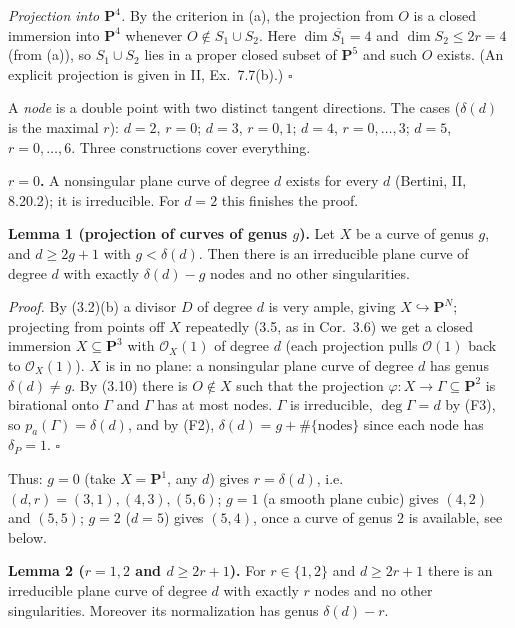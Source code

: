 \documentclass[11pt]{article}
\begin{document}
\emph{Projection into $\mathbf P^4$.} By the criterion in (a), the projection from $O$ is a closed immersion into $\mathbf P^4$ whenever $O\notin S_1\cup S_2$. Here $\dim\overline{S_1}=4$ and $\dim S_2\le2r=4$ (from (a)), so $S_1\cup S_2$ lies in a proper closed subset of $\mathbf P^5$ and such $O$ exists. (An explicit projection is given in II, Ex.~7.7(b).) \hfill$\square$

\pf
A \emph{node} is a double point with two distinct tangent directions. The cases ($\delta(d)$ is the maximal $r$): $d=2$, $r=0$; $d=3$, $r=0,1$; $d=4$, $r=0,\dots,3$; $d=5$, $r=0,\dots,6$. Three constructions cover everything.

\textbf{$r=0$.} A nonsingular plane curve of degree $d$ exists for every $d$ (Bertini, II, 8.20.2); it is irreducible. For $d=2$ this finishes the proof.

\textbf{Lemma 1 (projection of curves of genus $g$).} Let $X$ be a curve of genus $g$, and $d\ge2g+1$ with $g<\delta(d)$. Then there is an irreducible plane curve of degree $d$ with exactly $\delta(d)-g$ nodes and no other singularities.

\emph{Proof.} By (3.2)(b) a divisor $D$ of degree $d$ is very ample, giving $X\hookrightarrow\mathbf P^N$; projecting from points off $X$ repeatedly (3.5, as in Cor.~3.6) we get a closed immersion $X\subseteq\mathbf P^3$ with $\mathcal O_X(1)$ of degree $d$ (each projection pulls $\mathcal O(1)$ back to $\mathcal O_X(1)$). $X$ is in no plane: a nonsingular plane curve of degree $d$ has genus $\delta(d)\ne g$. By (3.10) there is $O\notin X$ such that the projection $\varphi:X\to\Gamma\subseteq\mathbf P^2$ is birational onto $\Gamma$ and $\Gamma$ has at most nodes. $\Gamma$ is irreducible, $\deg\Gamma=d$ by (F3), so $p_a(\Gamma)=\delta(d)$, and by (F2), $\delta(d)=g+\#\{\text{nodes}\}$ since each node has $\delta_P=1$. \hfill$\square$

Thus: $g=0$ (take $X=\mathbf P^1$, any $d$) gives $r=\delta(d)$, i.e.\ $(d,r)=(3,1),(4,3),(5,6)$; $g=1$ (a smooth plane cubic) gives $(4,2)$ and $(5,5)$; $g=2$ ($d=5$) gives $(5,4)$, once a curve of genus $2$ is available, see below.

\textbf{Lemma 2 ($r=1,2$ and $d\ge2r+1$).} For $r\in\{1,2\}$ and $d\ge2r+1$ there is an irreducible plane curve of degree $d$ with exactly $r$ nodes and no other singularities. Moreover its normalization has genus $\delta(d)-r$.
\end{document}
